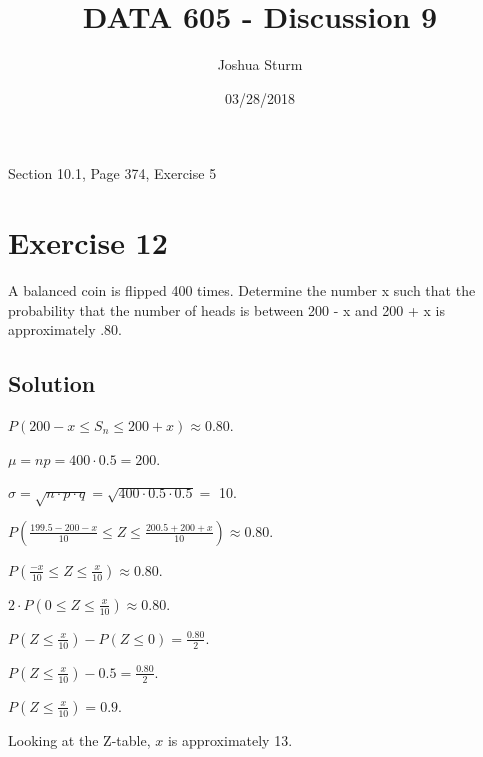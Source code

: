 \documentclass[]{article}
\title{DATA 605 - Discussion 9}
\author{Joshua Sturm}
\date{03/28/2018}
\begin{document}
\maketitle

Section 10.1, Page 374, Exercise 5

\section{Exercise 12}\label{exercise-12}

A balanced coin is flipped 400 times. Determine the number x such that
the probability that the number of heads is between 200 - x and 200 + x
is approximately .80.

\subsection{Solution}\label{solution}

\(P(200 - x \leq S_n \leq 200 + x) \approx 0.80\).

\(\mu = np = 400\cdot0.5 = 200\).

\(\sigma = \sqrt{n\cdot p\cdot q} = \sqrt{400\cdot0.5\cdot0.5} =\) 10.

\(P(\frac{199.5 - 200 - x}{10} \leq Z \leq \frac{200.5 + 200 + x}{10}) \approx 0.80\).

\(P(\frac{-x}{10} \leq Z \leq \frac{x}{10}) \approx 0.80\).

\(2 \cdot P(0 \leq Z \leq \frac{x}{10}) \approx 0.80\).

\(P(Z \leq \frac{x}{10}) - P(Z \leq 0) = \frac{0.80}{2}\).

\(P(Z \leq \frac{x}{10}) - 0.5 = \frac{0.80}{2}\).

\(P(Z \leq \frac{x}{10}) = 0.9\).

Looking at the Z-table, \(x\) is approximately 13.
\end{document}
